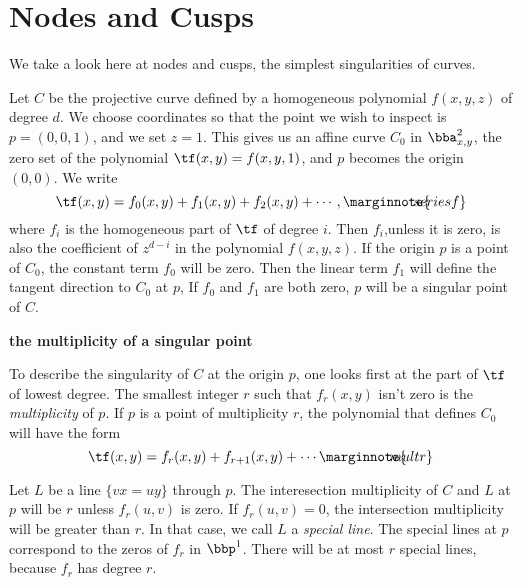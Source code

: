 \documentclass[leqno]{book}
\newcommand\Marginnote[1]{\marginnote{\hspace{-12pt}\normalfont{#1}}}
\renewcommand\theequation{\thesection.\arabic{equation}}
\newenvironment{boldequation}{\renewcommand\theequation{\textbf{\thesection.\arabic{equation}}}\equation}
   {\endequation}
\theoremstyle{definition}%
\numberwithin{equation}{section}
\theoremstyle{theorem} %
\begin{document}
 \section{Nodes and Cusps} \label{nodes}\Marginnote{nodes}

\msno We take a look here at nodes and cusps, the simplest
singularities of curves.


\ms Let $C$ be the projective curve defined by a homogeneous
polynomial $f(x,y,z)$ of degree $d$.  We choose coordinates so that
the point we wish to inspect is $p=(0,0,1)$, and we set $z=1$.  This
gives us an affine curve $C_0$ in $\bba^2_{x,y}$, the zero set of the
polynomial $\tf(x,y) = f(x,y,1)$, and $p$ becomes the origin $(0,0)$.  We
write
\begin{equation}
 \tf(x,y) = f_0(x,y) + f_1(x,y) + f_2(x,y) + \cdots,\Marginnote{seriesf}
	\label{seriesf}
\end{equation}
where $f_i$ is the homogeneous part of $\tf$ of degree $i$. Then
$f_i$,unless it is zero, is also the coefficient of $z^{d-i}$ in the
polynomial $f(x,y,z)$.  If the origin $p$ is a point of $C_0$, the
constant term $f_0$ will be zero.  Then the linear term $f_1$ will
define the tangent direction to $C_0$ at $p$, If $f_0$ and $f_1$ are
both zero, $p$ will be a singular point of $C$.

\begin{boldequation}\Marginnote{singmult} 
\hspace{-7cm} \textbf{the multiplicity of a singular point}
\label{singmult}\end{boldequation}

  To describe the singularity
of $C$ at the origin $p$, one looks first at the part of
$\tf$  of lowest degree.  The smallest integer $r$ such
that $f_r(x,y)$ isn't zero is  the {\it multiplicity} of $p$.
If $p$ is a point of multiplicity $r$, the
polynomial that defines $C_0$ will have the form
\begin{equation}
 \tf(x,y) = f_r(x,y) + f_{r+1}(x,y) + \cdots \Marginnote{multr}
 	\label{multr}
\end{equation}


Let $L$ be
a line $\{vx=uy\}$ through $p$.  The interesection multiplicity of
$C$ and $L$ at $p$ will be $r$ unless $f_r(u,v)$ is zero.  If
$f_r(u,v)=0$, the intersection multiplicity will be greater than $r$.
In that case, we call $L$ a {\it special line}.  The special
lines at $p$ correspond to the zeros of $f_r$ in $\bbp^1$. There will
be at most $r$ special lines, because $f_r$ has degree $r$.
\end{document}
